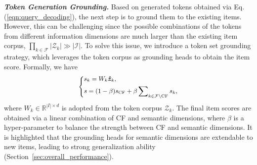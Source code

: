 \vspace{2pt}
\textit{\textbf{Token Generation Grounding.}} 
Based on generated tokens obtained via Eq. (\ref{eqn:query_decoding}), the next step is to ground them to the existing items. 
However, this can be challenging since the possible combinations of the tokens from different information dimensions are much larger than the existing item corpus, \ie $\prod_{k\in\mathcal{F}}|\mathcal{Z}_k|\gg |\mathcal{I}|$. 
To solve this issue, we introduce a token set grounding strategy, which leverages the token corpus as grounding heads to obtain the item score. 
Formally, we have 
\begin{equation}\label{eqn:single_logits}\small
\left\{
\begin{aligned}    &s_k=W_{k}\bm{\hat{z}}_k, \\
&s = (1-\beta) s_\text{CF} + \beta \sum\nolimits_{{k\in \mathcal{F}\setminus{\text{CF}}}} s_{k}, \\
\end{aligned}
\right.
\end{equation}
where $W_{k}\in\mathbb{R}^{|I|\times d}$ is adopted from the token corpus $\mathcal{Z}_k$. 
The final item scores are obtained via a linear combination of CF and semantic dimensions, where $\beta$ is a hyper-parameter to balance the strength between CF and semantic dimensions. 
It is highlighted that the grounding heads for semantic dimensions are extendable to new items, leading to strong generalization ability (\cf Section~\ref{sec:overall_performance}). 


